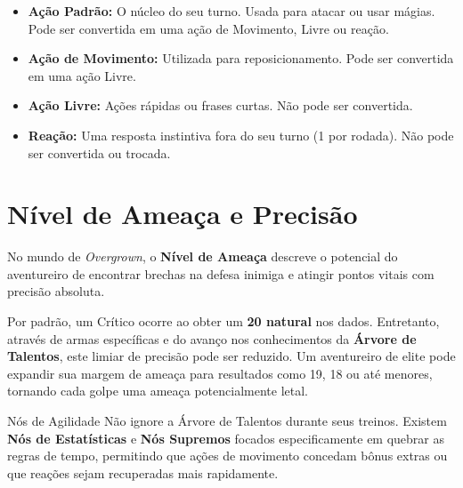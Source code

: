 \begin{itemize}
    \item \textbf{Ação Padrão:} O núcleo do seu turno. Usada para atacar ou usar mágias. Pode ser convertida em uma ação de Movimento, Livre ou reação.
    \item \textbf{Ação de Movimento:} Utilizada para reposicionamento. Pode ser convertida em uma ação Livre.
    \item \textbf{Ação Livre:} Ações rápidas ou frases curtas. Não pode ser convertida.
    \item \textbf{Reação:} Uma resposta instintiva fora do seu turno (1 por rodada). Não pode ser convertida ou trocada.
\end{itemize}

\section*{Nível de Ameaça e Precisão}

No mundo de \textit{Overgrown}, o \textbf{Nível de Ameaça} descreve o potencial do aventureiro de encontrar brechas na defesa inimiga e atingir pontos vitais com precisão absoluta. 

Por padrão, um Crítico ocorre ao obter um \textbf{20 natural} nos dados. Entretanto, através de armas específicas e do avanço nos conhecimentos da \textbf{Árvore de Talentos}, este limiar de precisão pode ser reduzido. Um aventureiro de elite pode expandir sua margem de ameaça para resultados como 19, 18 ou até menores, tornando cada golpe uma ameaça potencialmente letal.

\begin{rpgboxtips}{Nós de Agilidade}
Não ignore a Árvore de Talentos durante seus treinos. Existem \textbf{Nós de Estatísticas} e \textbf{Nós Supremos} focados especificamente em quebrar as regras de tempo, permitindo que ações de movimento concedam bônus extras ou que reações sejam recuperadas mais rapidamente.
\end{rpgboxtips}
